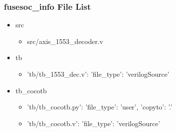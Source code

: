 \subsubsection{fusesoc\_info File List}
\begin{itemize}
\item src
	\begin{itemize}
	\item src/axis\_1553\_decoder.v
	\end{itemize}
\item tb
	\begin{itemize}
	\item {'tb/tb\_1553\_dec.v': {'file\_type': 'verilogSource'}}
	\end{itemize}
\item tb\_cocotb
	\begin{itemize}
	\item {'tb/tb\_cocotb.py': {'file\_type': 'user', 'copyto': '.'}}
	\item {'tb/tb\_cocotb.v': {'file\_type': 'verilogSource'}}
	\end{itemize}
\end{itemize}
